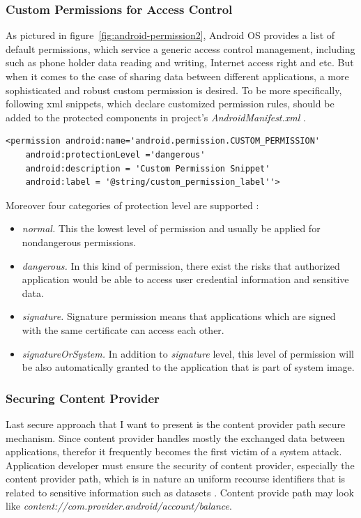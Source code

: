 \subsubsection{Custom Permissions for Access Control}

As pictured in figure~\ref{fig:android-permission2}, Android OS provides a list of default permissions, which service a generic access control management, including such as  phone  holder data reading and writing, Internet access right and etc. But when it comes to the case of sharing data between different applications, a more sophisticated and robust custom permission is desired. To be more specifically, following xml snippets, which declare customized permission rules, should be added to the protected components in project's \emph{AndroidManifest.xml} \cite{android_secure_cook}.

\begin{Verbatim}[fontsize=\relsize{-1},frame=lines,framesep=4mm, label=\fbox{\small\emph{Custom Permission Snippet}}]
<permission android:name='android.permission.CUSTOM_PERMISSION'
	android:protectionLevel ='dangerous'
	android:description = 'Custom Permission Snippet'
	android:label = '@string/custom_permission_label''>
\end{Verbatim} 
Moreover four categories of protection level are supported \cite{android_secure_cook}:
\begin{itemize}
\item \emph{normal.} This the lowest level of permission and usually be applied for nondangerous permissions. 
\item \emph{dangerous.}  In this kind of permission, there exist the risks that authorized application would be able to access user credential information and sensitive data.
\item \emph{signature.} Signature permission means that applications which are signed with the same certificate can access each other.
\item \emph{signatureOrSystem.} In addition to \emph{signature} level, this level of permission will be also automatically granted to the application that is part of system image.
\end{itemize}
\subsubsection{Securing Content Provider}
Last secure approach that I want to present is the content provider path  secure mechanism. Since content provider handles mostly the exchanged data between applications, therefor it frequently becomes the first victim of a system attack. Application developer must ensure the security of content provider, especially the content provider path, which is in nature an uniform recourse identifiers that is related  to sensitive information such as datasets \cite{android_secure_cook}. Content provide path may look like \emph{content://com.provider.android/account/balance}.


